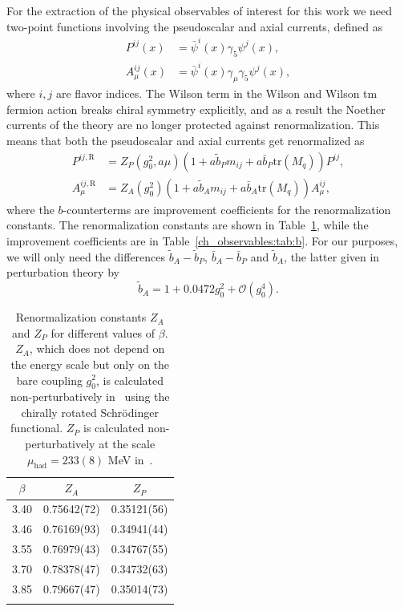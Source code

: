 For the extraction of the physical observables of interest for this work we need two-point functions involving the pseudoscalar and axial currents, defined as
\begin{align}
\label{ch_observables:eq:P}
P^{ij}(x)&=\bar{\psi}^{i}(x)\gamma_5\psi^{j}(x),\\
\label{ch_observables:eq:A}
A_{\mu}^{ij}(x)&=\bar{\psi}^i(x)\gamma_{\mu}\gamma_5\psi^{j}(x),
\end{align}
where $i,j$ are flavor indices. The Wilson term in the Wilson and Wilson tm fermion action breaks chiral symmetry explicitly, and as a result the Noether currents of the theory are no longer protected against renormalization. This means that both the pseudoscalar and axial currents get renormalized as
\begin{align}
\label{ch_observables:eq:corr_ren}
P^{ij,{\textrm{R}}}&=Z_P(g_0^2,a\mu)\left(1+a\tilde{b}_Pm_{ij}+a\bar{b}_P{\textrm{tr}}\left(M_q\right)\right)P^{ij}, \\
A_{\mu}^{ij,{\textrm{R}}}&=Z_A(g_0^2)\left(1+a\tilde{b}_Am_{ij}+a\bar{b}_A{\textrm{tr}}\left(M_q\right)\right)A_{\mu}^{ij},
\end{align}
where the $b$-counterterms are improvement coefficients for the renormalization constants. The renormalization constants are shown in Table~\ref{ch_observables:tab:Z}, while the improvement coefficients are in Table~\ref{ch_observables:tab:b}. For our purposes, we will only need the differences $\tilde{b}_A-\tilde{b}_P$, $\bar{b}_A-\bar{b}_P$ and $\tilde{b}_A$, the latter given in perturbation theory by~\citep{Taniguchi:1998pf}
\begin{equation}
\label{ch_observables:eq:bA}
\tilde{b}_A=1+0.0472g_0^2+\mathcal{O}(g_0^4).
\end{equation}

\begin{longtable}{c c c}
    \label{ch_observables:tab:Z}
    $\beta$ & $Z_A$ & $Z_P$ \\
    \toprule
    3.40 & 0.75642(72) & 0.35121(56) \\
    3.46 & 0.76169(93) & 0.34941(44) \\
    3.55 & 0.76979(43) & 0.34767(55) \\
    3.70 & 0.78378(47) & 0.34732(63) \\
    3.85 & 0.79667(47) & 0.35014(73) \\
    \bottomrule
    \caption{Renormalization constants $Z_A$ and $Z_P$ for different values of $\beta$. $Z_A$, which does not depend on the energy scale but only on the bare coupling $g_0^2$, is calculated non-perturbatively in~\citep{DallaBrida:2018tpn} using the chirally rotated Schrödinger functional. $Z_P$ is calculated non-perturbatively at the scale $\mu_{\textrm{had}}=233(8)$ MeV in~\citep{Campos:2018ahf}.}
\end{longtable}

